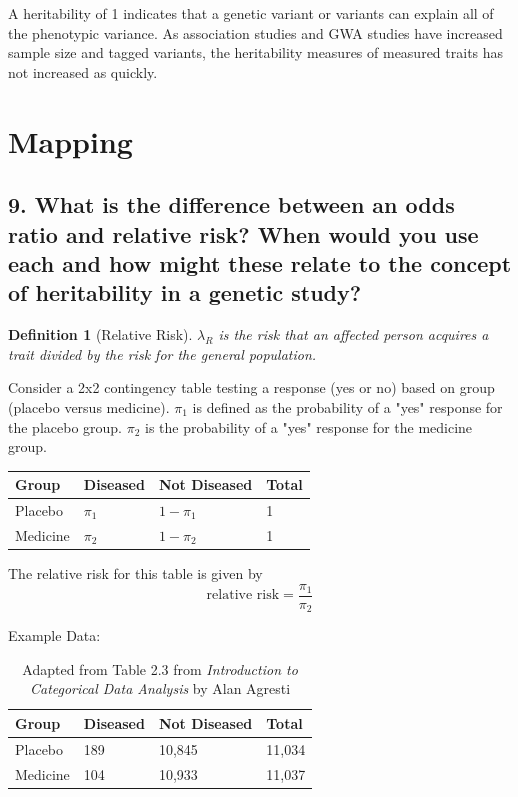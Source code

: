 \documentclass{tufte-handout}
\theoremstyle{noparens}
\newtheorem*{define}{Definition}
\begin{document}
A heritability of 1 indicates that a genetic variant or variants can explain all of the phenotypic variance. As association studies and GWA studies have increased sample size and tagged variants, the heritability measures of measured traits has not increased as quickly.

\newpage
\section{Mapping}\label{sec:map}

\subsection{9. What is the difference between an odds ratio and relative risk? When would you use each and how might these relate to the concept of heritability in a genetic study?}

\begin{define}[Relative Risk]
$\lambda_R$ is the risk that an affected person acquires a trait divided by the risk for the general population.
\end{define}

Consider a 2x2 contingency table testing a response (yes or no) based on group (placebo versus medicine). $\pi_1$ is defined as the probability of a "yes" response for the placebo group. $\pi_2$ is the probability of a "yes" response for the medicine group.

\begin{table}
\centering
\begin{tabular}{llll}
\toprule
Group & Diseased & Not Diseased & Total\\
\midrule
Placebo & $\pi_1$ & $1-\pi_1$ & 1\\
Medicine & $\pi_2$ & $1-\pi_2$ & 1\\
\bottomrule
\end{tabular}
\end{table}

The relative risk for this table is given by \[ \text{relative risk} = \frac{\pi_1}{\pi_2} \]

Example Data:

\begin{table}
\centering
\begin{tabular}{llll}
\toprule
Group & Diseased & Not Diseased & Total\\
\midrule
Placebo & 189 & 10,845 & 11,034\\
Medicine & 104 & 10,933 & 11,037\\
\bottomrule
\end{tabular}
\caption{Adapted from Table 2.3 from \emph{Introduction to Categorical Data Analysis} by Alan Agresti}
\end{table}
\end{document}
